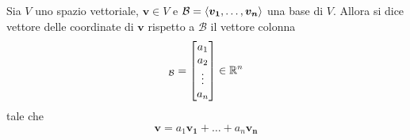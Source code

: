 \begin{definition}
    Sia $V$ uno spazio vettoriale, $\bm{v} \in V$ e $\mathcal{B} = \left\langle \bm{v_1}, \dots, \bm{v_n} \right\rangle$ una base di $V$. Allora si dice vettore delle coordinate di $\bm{v}$ rispetto a $\mathcal{B}$ il vettore colonna
    \begin{equation}
        [\bm{v}]_{\mathcal{B}} = \begin{bmatrix}
                                    a_1 \\
                                    a_2 \\
                                    \vdots \\
                                    a_n
                                 \end{bmatrix} \in \R^n
    \end{equation}
    tale che \begin{equation}
        \bm{v} = a_1\bm{v_1} + \dots + a_n\bm{v_n}
    \end{equation}
\end{definition}

